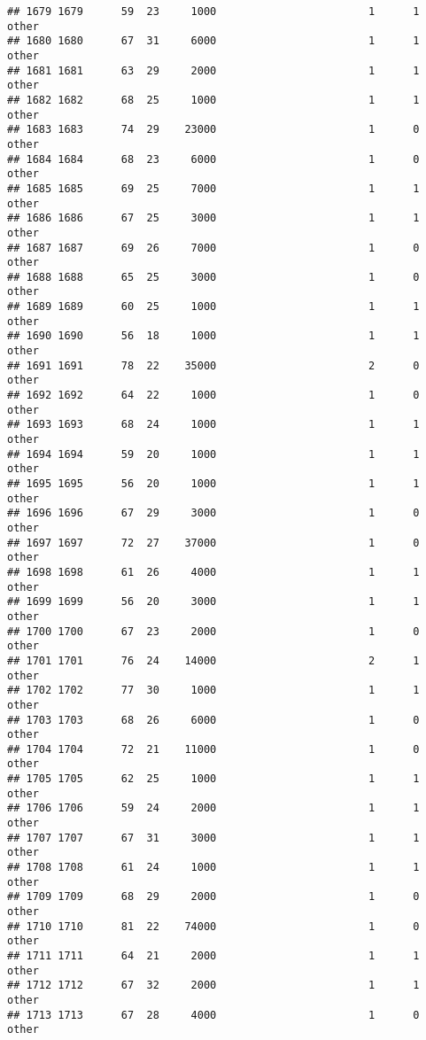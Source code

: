 \documentclass[
]{article}
\begin{document}
\begin{verbatim}
## 1679 1679      59  23     1000                        1      1    other
## 1680 1680      67  31     6000                        1      1    other
## 1681 1681      63  29     2000                        1      1    other
## 1682 1682      68  25     1000                        1      1    other
## 1683 1683      74  29    23000                        1      0    other
## 1684 1684      68  23     6000                        1      0    other
## 1685 1685      69  25     7000                        1      1    other
## 1686 1686      67  25     3000                        1      1    other
## 1687 1687      69  26     7000                        1      0    other
## 1688 1688      65  25     3000                        1      0    other
## 1689 1689      60  25     1000                        1      1    other
## 1690 1690      56  18     1000                        1      1    other
## 1691 1691      78  22    35000                        2      0    other
## 1692 1692      64  22     1000                        1      0    other
## 1693 1693      68  24     1000                        1      1    other
## 1694 1694      59  20     1000                        1      1    other
## 1695 1695      56  20     1000                        1      1    other
## 1696 1696      67  29     3000                        1      0    other
## 1697 1697      72  27    37000                        1      0    other
## 1698 1698      61  26     4000                        1      1    other
## 1699 1699      56  20     3000                        1      1    other
## 1700 1700      67  23     2000                        1      0    other
## 1701 1701      76  24    14000                        2      1    other
## 1702 1702      77  30     1000                        1      1    other
## 1703 1703      68  26     6000                        1      0    other
## 1704 1704      72  21    11000                        1      0    other
## 1705 1705      62  25     1000                        1      1    other
## 1706 1706      59  24     2000                        1      1    other
## 1707 1707      67  31     3000                        1      1    other
## 1708 1708      61  24     1000                        1      1    other
## 1709 1709      68  29     2000                        1      0    other
## 1710 1710      81  22    74000                        1      0    other
## 1711 1711      64  21     2000                        1      1    other
## 1712 1712      67  32     2000                        1      1    other
## 1713 1713      67  28     4000                        1      0    other

\end{verbatim}
\end{document}
